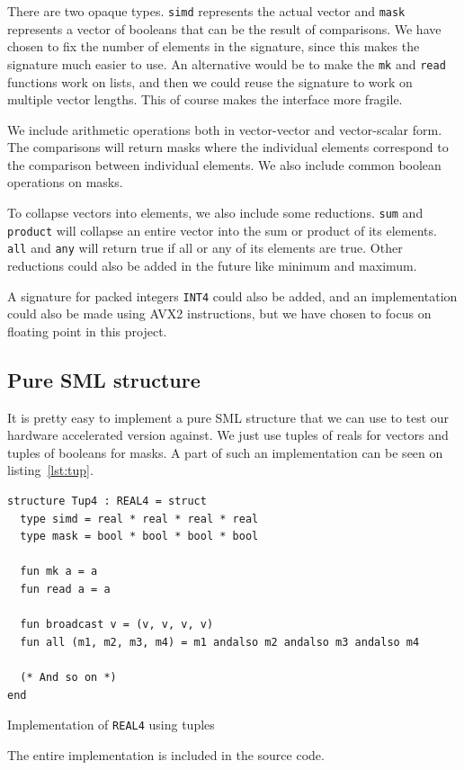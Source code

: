 \documentclass{article}
\begin{document}
There are two opaque types. \verb!simd! represents the actual vector and \verb!mask! represents a vector of booleans that can be the result of comparisons. We have chosen to fix the number of elements in the signature, since this makes the signature much easier to use. An alternative would be to make the \verb!mk! and \verb!read! functions work on lists, and then we could reuse the signature to work on multiple vector lengths. This of course makes the interface more fragile.

We include arithmetic operations both in vector-vector and vector-scalar form. The comparisons will return masks where the individual elements correspond to the comparison between individual elements. We also include common boolean operations on masks.

To collapse vectors into elements, we also include some reductions. \verb!sum! and \verb!product! will collapse an entire vector into the sum or product of its elements. \verb!all! and \verb!any! will return true if all or any of its elements are true. Other reductions could also be added in the future like minimum and maximum.

A signature for packed integers \texttt{INT4} could also be added, and an implementation could also be made using AVX2 instructions, but we have chosen to focus on floating point in this project.

\subsection{Pure SML structure}

It is pretty easy to implement a pure SML structure that we can use to test our hardware accelerated version against. We just use tuples of reals for vectors and tuples of booleans for masks. A part of such an implementation can be seen on listing~\ref{lst:tup}.
\begin{listing}[ht]
\begin{verbatim}
structure Tup4 : REAL4 = struct
  type simd = real * real * real * real
  type mask = bool * bool * bool * bool

  fun mk a = a
  fun read a = a

  fun broadcast v = (v, v, v, v)
  fun all (m1, m2, m3, m4) = m1 andalso m2 andalso m3 andalso m4

  (* And so on *)
end
\end{verbatim}
\caption{Implementation of \texttt{REAL4} using tuples}
\label{lst:tup}
\end{listing}
The entire implementation is included in the source code.
\end{document}
